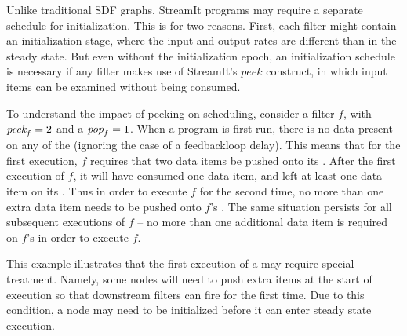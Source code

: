 Unlike traditional SDF graphs, StreamIt programs may require a
separate schedule for initialization.  This is for two reasons.
First, each filter might contain an initialization stage, where the
input and output rates are different than in the steady state.  But
even without the initialization epoch, an initialization schedule is
necessary if any filter makes use of StreamIt's $peek$ construct, in
which input items can be examined without being consumed.

To understand the impact of peeking on scheduling, consider a filter
$f$, with $\mbox{\it peek}_f = 2$ and a $\mbox{\it pop}_f = 1$. When a {\StreamIt}
program is first run, there is no data present on any of the
{\Channels} (ignoring the case of a feedbackloop delay).  This means
that for the first execution, {\filter} $f$ requires that two data
items be pushed onto its {\Input} {\Channel}.  After the first
execution of $f$, it will have consumed one data item, and left at
least one data item on its {\Input} {\Channel}.  Thus in order to
execute $f$ for the second time, no more than one extra data item
needs to be pushed onto $f$'s {\Input} {\Channel}.  The same situation
persists for all subsequent executions of $f$ -- no more than one
additional data item is required on $f$'s {\Input} {\Channel} in order
to execute $f$.

This example illustrates that the first execution of a {\filter} may
require special treatment.  Namely, some nodes will need to push extra
items at the start of execution so that downstream filters can fire
for the first time.  Due to this condition, a {\StreamIt} node may
need to be initialized before it can enter steady state execution.



